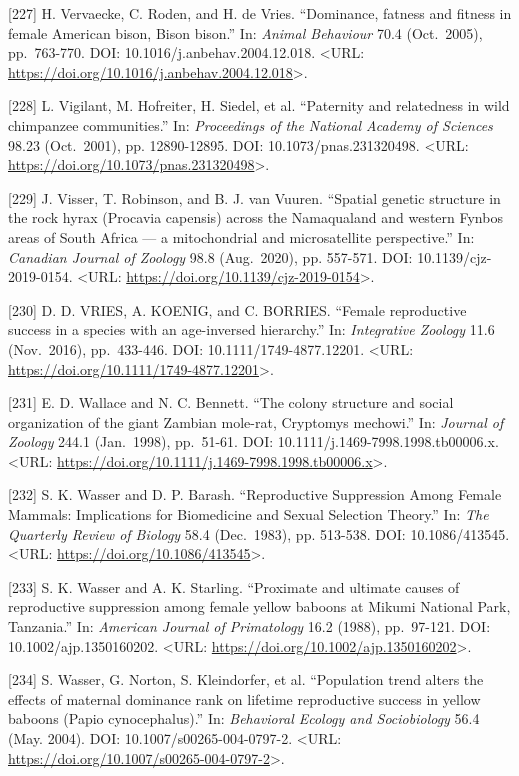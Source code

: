 \documentclass[
]{article}
\begin{document}
{[}227{]} H. Vervaecke, C. Roden, and H. de Vries. ``Dominance, fatness
and fitness in female American bison, Bison bison.'' In: \emph{Animal
Behaviour} 70.4 (Oct.~2005), pp.~763-770. DOI:
10.1016/j.anbehav.2004.12.018. \textless URL:
\url{https://doi.org/10.1016/j.anbehav.2004.12.018}\textgreater.

{[}228{]} L. Vigilant, M. Hofreiter, H. Siedel, et al. ``Paternity and
relatedness in wild chimpanzee communities.'' In: \emph{Proceedings of
the National Academy of Sciences} 98.23 (Oct.~2001), pp. 12890-12895.
DOI: 10.1073/pnas.231320498. \textless URL:
\url{https://doi.org/10.1073/pnas.231320498}\textgreater.

{[}229{]} J. Visser, T. Robinson, and B. J. van Vuuren. ``Spatial
genetic structure in the rock hyrax (Procavia capensis) across the
Namaqualand and western Fynbos areas of South Africa --- a mitochondrial
and microsatellite perspective.'' In: \emph{Canadian Journal of Zoology}
98.8 (Aug.~2020), pp. 557-571. DOI: 10.1139/cjz-2019-0154.
\textless URL: \url{https://doi.org/10.1139/cjz-2019-0154}\textgreater.

{[}230{]} D. D. VRIES, A. KOENIG, and C. BORRIES. ``Female reproductive
success in a species with an age-inversed hierarchy.'' In:
\emph{Integrative Zoology} 11.6 (Nov.~2016), pp.~433-446. DOI:
10.1111/1749-4877.12201. \textless URL:
\url{https://doi.org/10.1111/1749-4877.12201}\textgreater.

{[}231{]} E. D. Wallace and N. C. Bennett. ``The colony structure and
social organization of the giant Zambian mole-rat, Cryptomys mechowi.''
In: \emph{Journal of Zoology} 244.1 (Jan.~1998), pp.~51-61. DOI:
10.1111/j.1469-7998.1998.tb00006.x. \textless URL:
\url{https://doi.org/10.1111/j.1469-7998.1998.tb00006.x}\textgreater.

{[}232{]} S. K. Wasser and D. P. Barash. ``Reproductive Suppression
Among Female Mammals: Implications for Biomedicine and Sexual Selection
Theory.'' In: \emph{The Quarterly Review of Biology} 58.4 (Dec.~1983),
pp. 513-538. DOI: 10.1086/413545. \textless URL:
\url{https://doi.org/10.1086/413545}\textgreater.

{[}233{]} S. K. Wasser and A. K. Starling. ``Proximate and ultimate
causes of reproductive suppression among female yellow baboons at Mikumi
National Park, Tanzania.'' In: \emph{American Journal of Primatology}
16.2 (1988), pp.~97-121. DOI: 10.1002/ajp.1350160202. \textless URL:
\url{https://doi.org/10.1002/ajp.1350160202}\textgreater.

{[}234{]} S. Wasser, G. Norton, S. Kleindorfer, et al. ``Population
trend alters the effects of maternal dominance rank on lifetime
reproductive success in yellow baboons (Papio cynocephalus).'' In:
\emph{Behavioral Ecology and Sociobiology} 56.4 (May. 2004). DOI:
10.1007/s00265-004-0797-2. \textless URL:
\url{https://doi.org/10.1007/s00265-004-0797-2}\textgreater.
\end{document}
